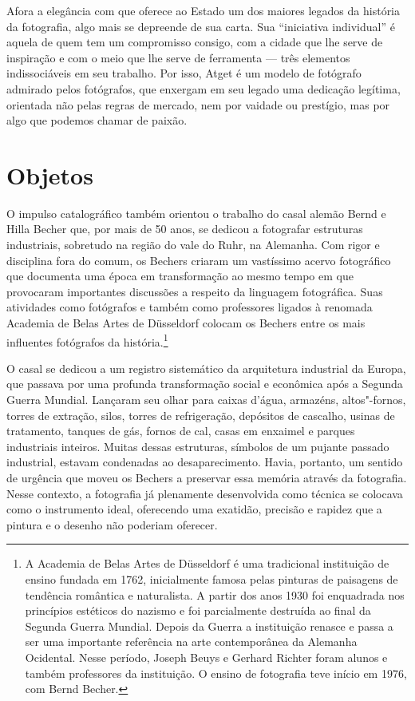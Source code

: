 Afora a elegância com que oferece ao Estado um dos maiores legados da
história da fotografia, algo mais se depreende de sua carta. Sua
``iniciativa individual'' é aquela de quem tem um compromisso consigo,
com a cidade que lhe serve de inspiração e com o meio que lhe serve de
ferramenta --- três elementos indissociáveis em seu trabalho. Por isso,
Atget é um modelo de fotógrafo admirado pelos fotógrafos, que enxergam
em seu legado uma dedicação legítima, orientada não pelas regras de
mercado, nem por vaidade ou prestígio, mas por algo que podemos chamar
de paixão.

\chapter{Objetos}

O impulso catalográfico também orientou o trabalho do casal alemão Bernd
e Hilla Becher que, por mais de 50 anos, se dedicou a fotografar
estruturas industriais, sobretudo na região do vale do Ruhr, na
Alemanha. Com rigor e disciplina fora do comum, os Bechers criaram um
vastíssimo acervo fotográfico que documenta uma época em transformação
ao mesmo tempo em que provocaram importantes discussões a respeito da
linguagem fotográfica. Suas atividades como fotógrafos e também como
professores ligados à renomada Academia de Belas Artes de Düsseldorf
colocam os Bechers entre os mais influentes fotógrafos da
história.\footnote{A Academia de Belas Artes de Düsseldorf é uma
  tradicional instituição de ensino fundada em 1762, inicialmente famosa
  pelas pinturas de paisagens de tendência romântica e naturalista. A
  partir dos anos 1930 foi enquadrada nos princípios estéticos do
  nazismo e foi parcialmente destruída ao final da Segunda Guerra
  Mundial. Depois da Guerra a instituição renasce e passa a ser uma
  importante referência na arte contemporânea da Alemanha Ocidental.
  Nesse período, Joseph Beuys e Gerhard Richter foram alunos e também
  professores da instituição. O ensino de fotografia teve início em
  1976, com Bernd Becher.}

O casal se dedicou a um registro sistemático da arquitetura industrial
da Europa, que passava por uma profunda transformação social e econômica
após a Segunda Guerra Mundial. Lançaram seu olhar para caixas d'água,
armazéns, altos"-fornos, torres de extração, silos, torres de
refrigeração, depósitos de cascalho, usinas de tratamento, tanques de
gás, fornos de cal, casas em enxaimel e parques industriais inteiros.
Muitas dessas estruturas, símbolos de um pujante passado industrial,
estavam condenadas ao desaparecimento. Havia, portanto, um sentido de
urgência que moveu os Bechers a preservar essa memória através da
fotografia. Nesse contexto, a fotografia já plenamente desenvolvida como
técnica se colocava como o instrumento ideal, oferecendo uma exatidão,
precisão e rapidez que a pintura e o desenho não poderiam oferecer.

